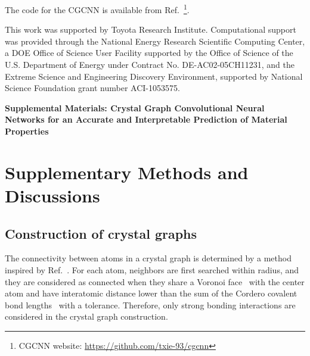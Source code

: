\documentclass[twocolumn, prl]{revtex4-1}
\begin{document}
The code for the CGCNN is available from Ref.~\footnote{CGCNN website: \href{https://github.com/txie-93/cgcnn}{https://github.com/txie-93/cgcnn}}.

\begin{acknowledgements}
This work was supported by Toyota Research Institute. Computational support was provided through the National Energy Research Scientific Computing Center, a DOE Office of Science User Facility supported by the Office of Science of the U.S. Department of Energy under Contract No. DE-AC02-05CH11231, and the Extreme Science and Engineering Discovery Environment, supported by National Science Foundation grant number ACI-1053575.
\end{acknowledgements}

























\widetext
\clearpage

\begin{center}
\textbf{\large Supplemental Materials: Crystal Graph Convolutional Neural Networks for an Accurate and Interpretable Prediction of Material Properties}
\end{center}
\setcounter{equation}{0}
\setcounter{figure}{0}
\setcounter{table}{0}
\setcounter{page}{1}
\makeatletter
\renewcommand{\theequation}{S\arabic{equation}}
\renewcommand{\thefigure}{S\arabic{figure}}
\renewcommand{\bibnumfmt}[1]{[S#1]}
\renewcommand{\citenumfont}[1]{S#1}


\section{Supplementary Methods and Discussions}

\subsection{Construction of crystal graphs}

The connectivity between atoms in a crystal graph is determined by a method inspired by Ref.~\cite{isayev2017universal}. For each atom, neighbors are first searched within  radius, and they are considered as connected when they share a Voronoi face~\cite{blatov2004voronoi} with the center atom and have interatomic distance lower than the sum of the Cordero covalent bond lengths~\cite{cordero2008covalent} with a  tolerance. Therefore, only strong bonding interactions are considered in the crystal graph construction.
\end{document}
